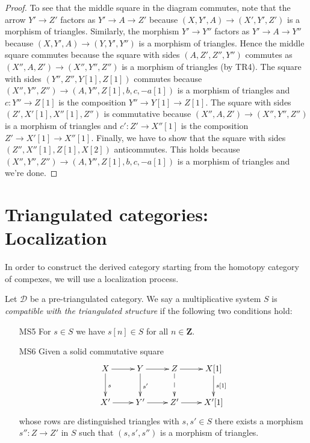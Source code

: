 \begin{proof}
\medskip\noindent
To see that the middle square in the diagram commutes, note
that the arrow $Y' \to Z'$ factors as $Y' \to A \to Z'$
because $(X, Y', A) \to (X', Y', Z')$ is a morphism of triangles.
Similarly, the morphism $Y' \to Y''$ factors as
$Y' \to A \to Y''$ because $(X, Y', A) \to (Y, Y', Y'')$ is a
morphism of triangles. Hence the middle square commutes because
the square with sides $(A, Z', Z'', Y'')$ commutes as
$(X'', A, Z') \to (X'', Y'', Z'')$ is a morphism of triangles (by TR4).
The square with sides $(Y'', Z'', Y[1], Z[1])$ commutes
because $(X'', Y'', Z'') \to (A, Y'', Z[1], b, c , -a[1])$
is a morphism of triangles and $c : Y'' \to Z[1]$ is the composition
$Y'' \to Y[1] \to Z[1]$.
The square with sides $(Z', X'[1], X''[1], Z'')$ is commutative
because $(X'', A, Z') \to (X'', Y'', Z'')$ is a morphism of triangles
and $c' : Z' \to X''[1]$ is the composition $Z' \to X'[1] \to X''[1]$.
Finally, we have to show that the square with sides
$(Z'', X''[1], Z[1], X[2])$ anticommutes. This holds because
$(X'', Y'', Z'') \to (A, Y'', Z[1], b, c , -a[1])$
is a morphism of triangles and we're done.
\end{proof}









\section{Triangulated categories: Localization}
\label{section-localization}

\noindent
In order to construct the derived category starting from the homotopy
category of compexes, we will use a localization process.

\begin{definition}
\label{definition-localization}
Let $\mathcal{D}$ be a pre-triangulated category. We say a multiplicative
system $S$ is {\it compatible with the triangulated structure} if
the following two conditions hold:
\begin{enumerate}
\item[MS5] For $s \in S$ we have $s[n] \in S$ for all $n \in \mathbf{Z}$.
\item[MS6] Given a solid commutative square
$$
\xymatrix{
X \ar[r] \ar[d]^s &
Y \ar[r] \ar[d]^{s'} &
Z \ar[r] \ar@{-->}[d] &
X[1] \ar[d]^{s[1]} \\
X' \ar[r] &
Y' \ar[r] &
Z' \ar[r] &
X'[1]
}
$$
whose rows are distinguished triangles with $s, s' \in S$
there exists a morphism $s'' : Z \to Z'$ in $S$ such that
$(s, s', s'')$ is a morphism of triangles.
\end{enumerate}
\end{definition}

